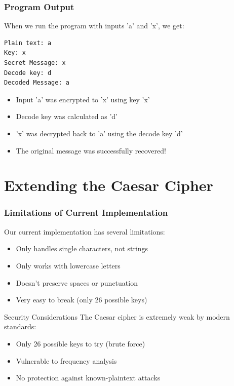 \documentclass{beamer}
\begin{document}
\begin{frame}[fragile]
    \frametitle{Program Output}
    
    When we run the program with inputs 'a' and 'x', we get:
    
    \begin{lstlisting}[language={}]
Plain text: a
Key: x
Secret Message: x
Decode key: d
Decoded Message: a
    \end{lstlisting}
    
    \begin{itemize}
        \item Input 'a' was encrypted to 'x' using key 'x'
        \item Decode key was calculated as 'd'
        \item 'x' was decrypted back to 'a' using the decode key 'd'
        \item The original message was successfully recovered!
    \end{itemize}
\end{frame}

\section{Extending the Caesar Cipher}

\begin{frame}[fragile]
    \frametitle{Limitations of Current Implementation}
    
    Our current implementation has several limitations:
    
    \begin{itemize}
        \item Only handles single characters, not strings
        \item Only works with lowercase letters
        \item Doesn't preserve spaces or punctuation
        \item Very easy to break (only 26 possible keys)
    \end{itemize}
    
    \begin{block}{Security Considerations}
        The Caesar cipher is extremely weak by modern standards:
        \begin{itemize}
            \item Only 26 possible keys to try (brute force)
            \item Vulnerable to frequency analysis
            \item No protection against known-plaintext attacks
        \end{itemize}
    \end{block}
\end{frame}
\end{document}
